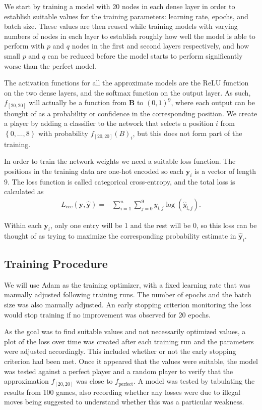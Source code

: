 \documentclass{somasmsc}
\begin{document}
We start by training a model with 20 nodes in each dense layer in order to establish suitable values for the training parameters: learning rate, epochs, and batch size. These values are then reused while training models with varying numbers of nodes in each layer to establish roughly how well the model is able to perform with $p$ and $q$ nodes in the first and second layers respectively, and how small $p$ and $q$ can be reduced before the model starts to perform significantly worse than the perfect model.

The activation functions for all the approximate models are the ReLU function on the two dense layers, and the softmax function on the output layer. As such, $f_{\left[20,20\right]}$ will actually be a function from $\mathbf{B}$ to $\left(0, 1\right)^9$, where each output can be thought of as a probability or confidence in the corresponding position. We create a player by adding a classifier to the network that selects a position $i$ from $\left\{0, \dots, 8\right\}$ with probability $f_{\left[20,20\right]}\left(B\right)_i$, but this does not form part of the training.

In order to train the network weights we need a suitable loss function. The positions in the training data are one-hot encoded so each $\pmb{y}_i$ is a vector of length 9. The loss function is called categorical cross-entropy, and the total loss is calculated as
\begin{align*}
   L_{\text{cce}}\left(\pmb{y},\hat{\pmb{y}}\right) = - \sum_{i=1}^n \sum_{j=0}^9 y_{i,j} \log\left(\hat{y}_{i,j}\right).
\end{align*}

Within each $\pmb{y}_i$, only one entry will be 1 and the rest will be 0, so this loss can be thought of as trying to maximize the corresponding probability estimate in $\hat{\pmb{y}}_i$.

\subsection{Training Procedure}\label{ox:train}

We will use Adam as the training optimizer, with a fixed learning rate that was manually adjusted following training runs. The number of epochs and the batch size was also manually adjusted. An early stopping criterion monitoring the loss would stop training if no improvement was observed for 20 epochs.

As the goal was to find suitable values and not necessarily optimized values, a plot of the loss over time was created after each training run and the parameters were adjusted accordingly. This included whether or not the early stopping criterion had been met. Once it appeared that the values were suitable, the model was tested against a perfect player and a random player to verify that the approximation $f_{\left[20,20\right]}$ was close to $f_{\text{perfect}}$. A model was tested by tabulating the results from 100 games, also recording whether any losses were due to illegal moves being suggested to understand whether this was a particular weakness.
\end{document}

